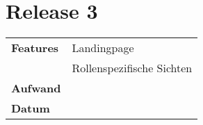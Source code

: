 
\section*{Release 3}
\label{sec:release_3}

\begin{tabular}{p{5cm} p{9cm}}
    \textbf{Features} & Landingpage \\
    & Rollenspezifische Sichten \\
    \hline
    \textbf{Aufwand} & \\
    \hline
    \textbf{Datum} & \\
\end{tabular}

